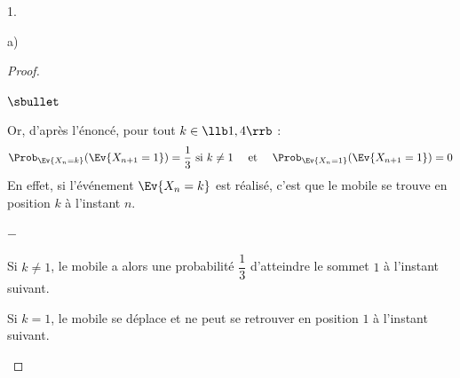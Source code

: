 \begin{noliste}{1.}
\begin{noliste}{a)}
\begin{proof}
\begin{noliste}{$\sbullet$}
        \newpage


      \item Or, d'après l'énoncé, pour tout $k \in \llb 1, 4\rrb$ :
        \[
        \Prob_{\Ev{X_n = k}}(\Ev{X_{n+1} = 1}) = \dfrac{1}{3} \text{
          si $k \neq 1$} \quad \text{ et } \quad \Prob_{\Ev{X_n =
            1}}(\Ev{X_{n+1} = 1}) = 0
        \]
        En effet, si l'événement $\Ev{X_n = k}$ est réalisé, c'est que
        le mobile se trouve en position $k$ à l'instant $n$.
        \begin{noliste}{$-$}
        \item Si $k \neq 1$, le mobile a alors une probabilité
          $\dfrac{1}{3}$ d'atteindre le sommet $1$ à l'instant
          suivant.
        \item Si $k = 1$, le mobile se déplace et ne peut se retrouver
          en position $1$ à l'instant suivant.
        \end{noliste}
        

\end{noliste}
\end{proof}
\end{noliste}
\end{noliste}
